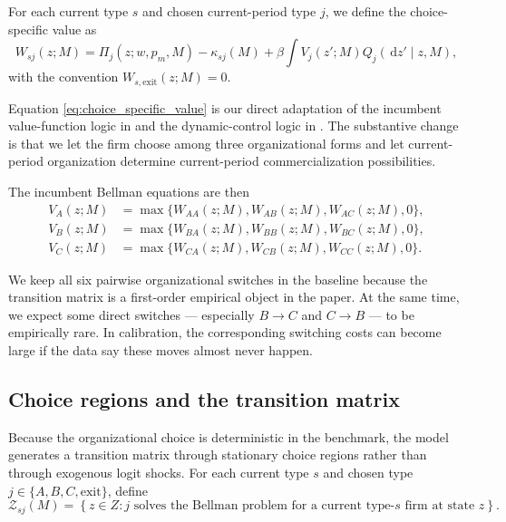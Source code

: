 \documentclass[12pt]{article}
\newcommand{\1}{\mathbf{1}}
\newcommand{\dd}{\,\mathrm{d}}
\begin{document}
For each current type $s$ and chosen current-period type $j$, we define the choice-specific value as
\begin{equation}
W_{sj}(z;M)=\Pi_j(z;w,p_m,M)-\kappa_{sj}(M)+\beta\int V_j(z';M)Q_j(\dd z'\mid z,M),
\label{eq:choice_specific_value}
\end{equation}
with the convention $W_{s,\text{exit}}(z;M)=0$.

Equation \eqref{eq:choice_specific_value} is our direct adaptation of the incumbent value-function logic in \citet{Hopenhayn1992} and the dynamic-control logic in \citet{EricsonPakes1995}. The substantive change is that we let the firm choose among three organizational forms and let current-period organization determine current-period commercialization possibilities.

The incumbent Bellman equations are then
\begin{align}
V_A(z;M) &= \max\bigl\{W_{AA}(z;M),W_{AB}(z;M),W_{AC}(z;M),0\bigr\}, \label{eq:VA}\\
V_B(z;M) &= \max\bigl\{W_{BA}(z;M),W_{BB}(z;M),W_{BC}(z;M),0\bigr\}, \label{eq:VB}\\
V_C(z;M) &= \max\bigl\{W_{CA}(z;M),W_{CB}(z;M),W_{CC}(z;M),0\bigr\}. \label{eq:VC}
\end{align}

We keep all six pairwise organizational switches in the baseline because the transition matrix is a first-order empirical object in the paper. At the same time, we expect some direct switches --- especially $B\rightarrow C$ and $C\rightarrow B$ --- to be empirically rare. In calibration, the corresponding switching costs can become large if the data say these moves almost never happen.

\subsection{Choice regions and the transition matrix}

Because the organizational choice is deterministic in the benchmark, the model generates a transition matrix through stationary choice regions rather than through exogenous logit shocks. For each current type $s$ and chosen type $j\in\{A,B,C,\text{exit}\}$, define
\begin{equation}
\mathcal Z_{sj}(M)=\left\{z\in Z: j \text{ solves the Bellman problem for a current type-}s\text{ firm at state } z\right\}.
\label{eq:choice_region}
\end{equation}
\end{document}
